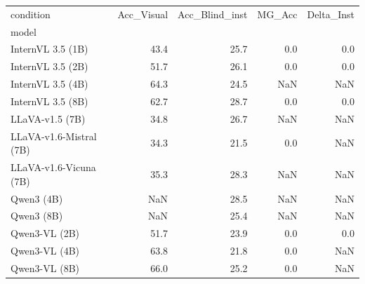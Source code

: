 \begin{tabular}{lrrrr}
\toprule
condition & Acc_Visual & Acc_Blind_inst & MG_Acc & Delta_Inst \\
model &  &  &  &  \\
\midrule
InternVL 3.5 (1B) & 43.4 & 25.7 & 0.0 & 0.0 \\
InternVL 3.5 (2B) & 51.7 & 26.1 & 0.0 & 0.0 \\
InternVL 3.5 (4B) & 64.3 & 24.5 & NaN & NaN \\
InternVL 3.5 (8B) & 62.7 & 28.7 & 0.0 & 0.0 \\
LLaVA-v1.5 (7B) & 34.8 & 26.7 & NaN & NaN \\
LLaVA-v1.6-Mistral (7B) & 34.3 & 21.5 & 0.0 & NaN \\
LLaVA-v1.6-Vicuna (7B) & 35.3 & 28.3 & NaN & NaN \\
Qwen3 (4B) & NaN & 28.5 & NaN & NaN \\
Qwen3 (8B) & NaN & 25.4 & NaN & NaN \\
Qwen3-VL (2B) & 51.7 & 23.9 & 0.0 & 0.0 \\
Qwen3-VL (4B) & 63.8 & 21.8 & 0.0 & NaN \\
Qwen3-VL (8B) & 66.0 & 25.2 & 0.0 & NaN \\
\bottomrule
\end{tabular}
